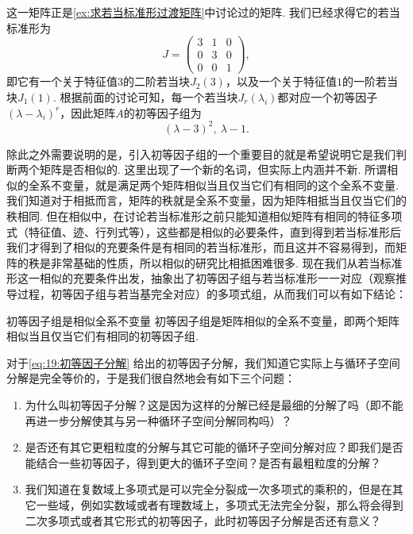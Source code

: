 \begin{solution}
    这一矩阵正是\autoref{ex:求若当标准形过渡矩阵}中讨论过的矩阵. 我们已经求得它的若当标准形为
    \[
        J=\begin{pmatrix}
                3 & 1 & 0 \\
                0 & 3 & 0 \\
                0 & 0 & 1
            \end{pmatrix},
    \]
    即它有一个关于特征值$3$的二阶若当块$J_2(3)$，以及一个关于特征值$1$的一阶若当块$J_1(1)$. 根据前面的讨论可知，每一个若当块$J_r(\lambda_i)$都对应一个初等因子$(\lambda-\lambda_i)^r$，因此矩阵$A$的初等因子组为
    \[
        (\lambda-3)^2,\ \lambda-1.
    \]
\end{solution}

除此之外需要说明的是，引入初等因子组的一个重要目的就是希望说明它是我们判断两个矩阵是否相似的. 这里出现了一个新的名词，但实际上内涵并不新. 所谓相似的全系不变量，就是满足两个矩阵相似当且仅当它们有相同的这个全系不变量. 我们知道对于相抵而言，矩阵的秩就是全系不变量，因为矩阵相抵当且仅当它们的秩相同. 但在相似中，在讨论若当标准形之前只能知道相似矩阵有相同的特征多项式（特征值、迹、行列式等），这些都是相似的必要条件，直到得到若当标准形后我们才得到了相似的充要条件是有相同的若当标准形，而且这并不容易得到，而矩阵的秩是非常基础的性质，所以相似的研究比相抵困难很多. 现在我们从若当标准形这一相似的充要条件出发，抽象出了初等因子组与若当标准形一一对应（观察推导过程，初等因子组与若当基完全对应）的多项式组，从而我们可以有如下结论：

\begin{theorem}{}{初等因子组是相似全系不变量}
    初等因子组是矩阵相似的全系不变量，即两个矩阵相似当且仅当它们有相同的初等因子组.
\end{theorem}

对于\autoref{eq:19:初等因子分解} 给出的初等因子分解，我们知道它实际上与循环子空间分解是完全等价的，于是我们很自然地会有如下三个问题：
\begin{enumerate}
    \item 为什么叫初等因子分解？这是因为这样的分解已经是最细的分解了吗（即不能再进一步分解使其与另一种循环子空间分解同构吗）？
    \item 是否还有其它更粗粒度的分解与其它可能的循环子空间分解对应？即我们是否能结合一些初等因子，得到更大的循环子空间？是否有最粗粒度的分解？
    \item 我们知道在复数域上多项式是可以完全分裂成一次多项式的乘积的，但是在其它一些域，例如实数域或者有理数域上，多项式无法完全分裂，那么将会得到二次多项式或者其它形式的初等因子，此时初等因子分解是否还有意义？
\end{enumerate}

